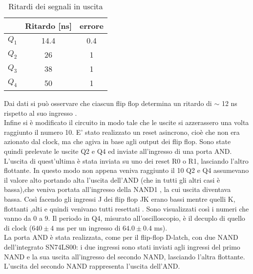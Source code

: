 \begin{table}[h]
	\centering
	\begin{tabular}{ccc }
		
		 & Ritardo [ns]& errore\\
		 \midrule 
		  $Q_{1}$ & 14.4 & 0.4 \\
		  $Q_{2}$ & 26 & 1 \\
		  $Q_{3}$ & 38 & 1 \\
          $Q_{4}$ & 50 & 1 \\
 	\end{tabular}
	\caption{ Ritardi dei segnali in uscita }
	\label{t:Ritardi}
\end{table}
Dai dati si può osservare che ciascun flip flop determina un ritardo di $\sim$ 12 ns rispetto al suo ingresso .\\
Infine si è modificato il circuito in modo tale che le uscite si azzerassero una volta raggiunto il numero 10. E' stato realizzato un reset asincrono, cioè che non era azionato dal clock, ma che agiva in base agli output dei flip flop. Sono state quindi prelevate le uscite Q2 e Q4 ed inviate all'ingresso di una porta AND. L'uscita di quest'ultima è stata inviata su uno dei reset R0 o R1, lasciando l'altro flottante. In questo modo non appena veniva raggiunto il 10 Q2 e Q4 assumevano il valore alto portando alta l'uscita dell'AND (che in tutti gli altri casi è bassa),che veniva portata all'ingresso della NAND1 , la cui uscita diventava bassa. Così facendo gli ingressi J dei flip flop JK erano bassi mentre quelli K, flottanti ,alti e quindi venivano tutti resettati . Sono visualizzati così i numeri che vanno da 0 a 9. Il periodo in Q4, misurato all'oscilloscopio, è il decuplo di quello di clock ($640 \pm 4$ ms per un ingresso di $64.0 \pm 0.4$ ms).\\
La porta AND è stata realizzata, come per il flip-flop D-latch, con due NAND dell'integrato SN74LS00: i due ingressi sono stati inviati agli ingressi del primo NAND e la sua uscita all'ingresso del secondo NAND, lasciando l'altra flottante. L'uscita del secondo NAND rappresenta l'uscita dell'AND.
